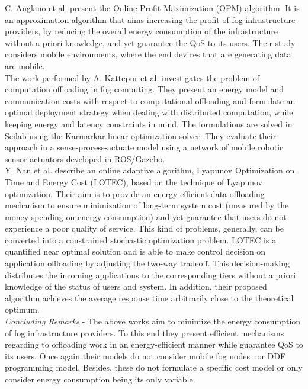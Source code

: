 \noindent\tab C. Anglano et al. \cite{anglano2018profit} present the Online Profit Maximization (OPM) algorithm. It is an approximation algorithm that aims increasing the profit of fog infrastructure providers, by reducing the overall energy consumption of the infrastructure without a priori knowledge, and yet guarantee the QoS to its users. Their study considers mobile environments, where the end devices that are generating data are mobile.\\
\noindent\tab The work performed by A. Kattepur et al. \cite{kattepur2016resource} investigates the problem of computation offloading in fog computing. They present an energy model and communication costs with respect to computational offloading and formulate an optimal deployment strategy when dealing with distributed computation, while keeping energy and latency constraints in mind. The formulations are solved in Scilab using the Karmarkar linear optimization solver. They evaluate their approach in a sense-process-actuate model using a network of mobile robotic sensor-actuators developed in ROS/Gazebo.\\
\noindent\tab Y. Nan et al. \cite{nan2017adaptive} describe an online adaptive algorithm, Lyapunov Optimization on Time and Energy Cost (LOTEC), based on the technique of Lyapunov optimization. Their aim is to provide an energy-efficient data offloading mechanism to ensure minimization of long-term system cost (measured by the money spending on energy consumption) and yet guarantee that users do not experience a poor quality of service. This kind of problems, generally, can be converted into a constrained stochastic optimization problem. LOTEC is a quantified near optimal solution and is able to make control decision on application offloading by adjusting the two-way tradeoff. This decision-making distributes the incoming applications to the corresponding tiers without a priori knowledge of the status of users and system. In addition, their proposed algorithm achieves the average response time arbitrarily close to the theoretical
optimum. \\[6pt]
\textit{Concluding Remarks} - The above works aim to minimize the energy consumption of fog infrastructure providers. To this end they present efficient mechanisms regarding to offloading work in an energy-efficient manner while guarantee QoS to its users. Once again their models do not consider mobile fog nodes nor DDF programming model. Besides, these do not formulate a specific cost model or only consider energy consumption being its only variable.

